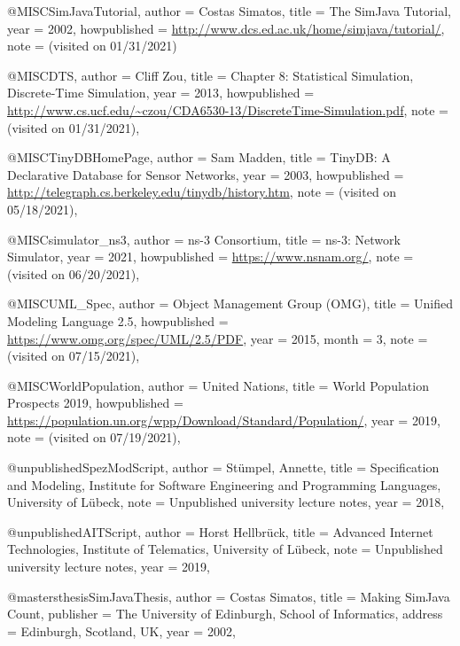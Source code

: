 \documentclass[english,version-2019-11]{uzl-thesis}
\begin{document}
\begin{bibtex-entries}

@MISC{SimJavaTutorial,
  author       = {Costas Simatos},
  title        = {The SimJava Tutorial},
  year         = {2002},
  howpublished = {\url{http://www.dcs.ed.ac.uk/home/simjava/tutorial/}},
  note         = {(visited on 01/31/2021)}
}

@MISC{DTS,
  author       = {Cliff Zou},
  title        = {Chapter 8: Statistical Simulation, Discrete-Time Simulation},
  year         = {2013},
  howpublished = {\url{http://www.cs.ucf.edu/~czou/CDA6530-13/DiscreteTime-Simulation.pdf}},
  note         = {(visited on 01/31/2021)},
}

@MISC{TinyDBHomePage,
  author       = {Sam Madden},
  title        = {TinyDB: A Declarative Database for Sensor Networks},
  year         = {2003},
  howpublished = {\url{http://telegraph.cs.berkeley.edu/tinydb/history.htm}},
  note         = {(visited on 05/18/2021)},
}

@MISC{simulator_ns3,
  author       = {{ns-3 Consortium}},
  title        = {ns-3: Network Simulator},
  year         = {2021},
  howpublished = {\url{https://www.nsnam.org/}},
  note         = {(visited on 06/20/2021)},
}


@MISC{UML_Spec,
  author        = {{Object Management Group (OMG)}},
  title         = {Unified Modeling Language 2.5},
  howpublished =  {\url{https://www.omg.org/spec/UML/2.5/PDF}},
  year          = {2015},
  month         = {3},
  note         =  {(visited on 07/15/2021)},
}

@MISC{WorldPopulation,
  author        = {{United Nations}},
  title         = {World Population Prospects 2019},
  howpublished =  {\url{https://population.un.org/wpp/Download/Standard/Population/}},
  year          = {2019},
  note         =  {(visited on 07/19/2021)},
}



@unpublished{SpezModScript,
    author = {St{\"u}mpel, Annette},
    title = {Specification and Modeling, Institute for Software Engineering and Programming Languages, University of L{\"u}beck},
    note = {Unpublished university lecture notes},
    year = {2018},
}

@unpublished{AITScript,
    author = {Horst Hellbr{\"u}ck},
    title = {Advanced Internet Technologies, Institute of Telematics, University of L{\"u}beck},
    note = {Unpublished university lecture notes},
    year = {2019},
}



@mastersthesis{SimJavaThesis,
    author    = {Costas Simatos},
    title     = {Making SimJava Count},
    publisher = {The University of Edinburgh, School of Informatics},
    address   = {Edinburgh, Scotland, UK},
    year      = {2002},
}


\end{bibtex-entries}
\end{document}
